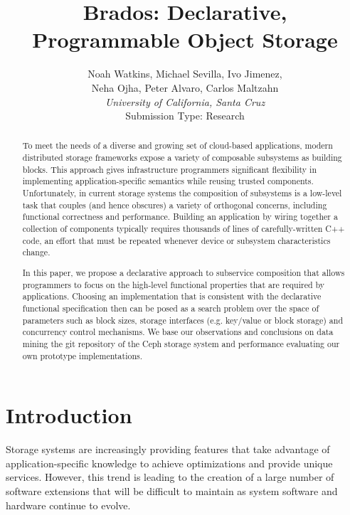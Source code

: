 \documentclass[10pt,twocolumn]{article}
\begin{document}
\title{Brados: Declarative, Programmable Object Storage}

\author{
Noah Watkins, Michael Sevilla, Ivo Jimenez, \\Neha Ojha, Peter Alvaro, Carlos
Maltzahn\\
\small {\em University of California, Santa Cruz} \\
\small Submission Type: Research
}

\date{}
\maketitle

\begin{abstract}
To meet the needs of a diverse and growing set of cloud-based applications,
modern distributed storage frameworks expose a variety of composable
subsystems as building blocks.  This approach gives infrastructure programmers
significant flexibility in implementing application-specific semantics while
reusing trusted components.  Unfortunately, in current storage systems the
composition of subsystems is a low-level task that couples (and hence
obscures) a variety of orthogonal concerns, including functional correctness
and performance.  Building an application by wiring together a collection of
components typically requires thousands of lines of carefully-written C++
code, an effort that must be repeated whenever device or subsystem
characteristics change.

In this paper, we propose a declarative approach to subservice composition that
allows programmers to focus on the high-level functional properties that are
required by applications.  Choosing an implementation that is consistent with
the declarative functional specification then can be posed as a search problem
over the space of parameters such as block sizes, storage interfaces (e.g.
key/value or block storage) and concurrency control mechanisms. We base our
observations and conclusions on data mining the git repository of the Ceph
storage system and performance evaluating our own prototype implementations.
\end{abstract}

\section{Introduction}

Storage systems are increasingly providing features that take advantage of
application-specific knowledge to achieve optimizations and provide unique
services. However, this trend is leading to the creation of a large number of
software extensions that will be difficult to maintain as system software and
hardware continue to evolve.
\end{document}

